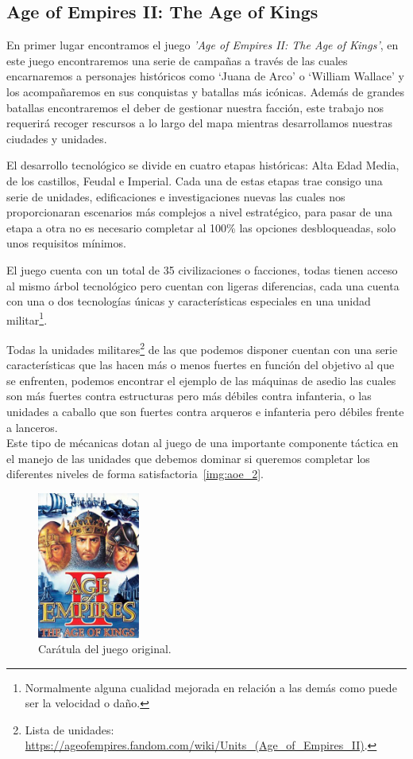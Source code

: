 \subsection{Age of Empires II: The Age of Kings}
En primer lugar encontramos el juego \textit{'Age of Empires II: The Age of Kings'}, en
este juego encontraremos una serie de campañas a través de las cuales encarnaremos a personajes
históricos como `Juana de Arco' o `William Wallace' y los acompañaremos en sus conquistas y
batallas más icónicas. Además de grandes batallas encontraremos el deber de gestionar nuestra
facción, este trabajo nos requerirá recoger rescursos a lo largo del mapa mientras desarrollamos 
nuestras ciudades y unidades.

El desarrollo tecnológico se divide en cuatro etapas históricas: Alta Edad Media,
de los castillos, Feudal e Imperial. Cada una de estas etapas trae consigo una serie de
unidades, edificaciones e investigaciones nuevas las cuales nos proporcionaran escenarios
más complejos a nivel estratégico, para pasar de una etapa a otra no es necesario completar
al 100\% las opciones desbloqueadas, solo unos requisitos mínimos.

El juego cuenta con un total de 35 civilizaciones o facciones, todas tienen acceso al mismo árbol
tecnológico pero cuentan con ligeras diferencias, cada una cuenta con una o dos tecnologías únicas
y características especiales en una unidad militar\footnote{Normalmente alguna cualidad mejorada en relación a las
demás como puede ser la velocidad o daño.}.

Todas la unidades militares\footnote{Lista de unidades: \url{https://ageofempires.fandom.com/wiki/Units_(Age_of_Empires_II)}.}
de las que podemos disponer cuentan con una serie características que
las hacen más o menos fuertes en función del objetivo al que se enfrenten, podemos encontrar
el ejemplo de las máquinas de asedio las cuales son más fuertes contra estructuras pero
más débiles contra infanteria, o las unidades a caballo que son fuertes contra arqueros
e infanteria pero débiles frente a lanceros. \\
Este tipo de mécanicas dotan al juego de una importante componente táctica en el manejo
de las unidades que debemos dominar si queremos completar los diferentes niveles de
forma satisfactoria~\ref{img:aoe_2}.

\begin{figure}[ht]
\centering
\includegraphics[width=0.3\textwidth]{imagenes/marco_teo/referentes/aoe_1.png}
\caption{Carátula del juego original.}
\label{img:aoe_1}
\end{figure}

